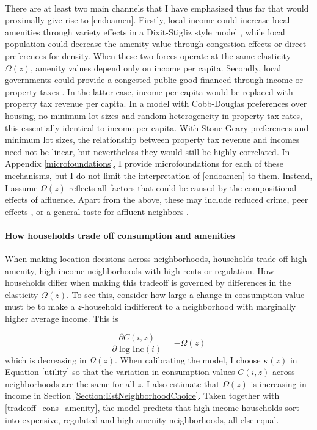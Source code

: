 \documentclass[12pt]{article}
\begin{document}
	 \paragraph*{}
	There are at least two main channels that I have emphasized thus far that would proximally give rise to \eqref{endoamen}. Firstly, local income could increase local amenities through variety effects in a Dixit-Stigliz style model \citep{AlmagroDI, Coutureetal}, while local population could decrease the amenity value through congestion effects or direct preferences for density. When these two forces operate at the same elasticity $\Omega(z)$, amenity values depend only on income per capita. Secondly, local governments could provide a congested public good financed through income or property taxes \citep{calabresetal, ineffTiebout}. In the latter case, income per capita would be replaced with property tax revenue per capita. In a model with Cobb-Douglas preferences over housing, no minimum lot sizes and random heterogeneity in property tax rates, this essentially identical to income per capita. With Stone-Geary preferences and minimum lot sizes, the relationship between property tax revenue and incomes need not be linear, but nevertheless they would still be highly correlated. In Appendix \ref{microfoundations}, I provide microfoundations for each of these mechanisms, but I do not limit the interpretation of \eqref{endoamen} to them. Instead, I assume $\Omega(z)$ reflects all factors that could be caused by the compositional effects of affluence. Apart from the above, these may include reduced crime, peer effects \citep{chettyhendren}, or a general taste for affluent neighbors \citep{ghh2013, parispoor}. 

	
	\paragraph*{How households trade off consumption and amenities} When making location decisions across neighborhoods, households trade off high amenity, high income neighborhoods with high rents or regulation. How households differ when making this tradeoff is governed by differences in the elasticity $\Omega(z)$. To see this, consider how large a change in consumption value must be to make a $z$-household indifferent to a neighborhood with marginally higher average income. This is 
	
	\begin{equation}\label{tradeoff_cons_amenity}
		\frac{\partial C(i, z)}{\partial \log \text{Inc}(i)} = -\Omega(z)
	\end{equation} 
	which is decreasing in $\Omega(z)$. When calibrating the model, I choose $\kappa(z)$ in Equation \eqref{utility} so that the variation in consumption values $C(i, z)$ across neighborhoods are the same for all $z$. I also estimate that $\Omega(z)$ is increasing in income in Section \ref{Section:EstNeighborhoodChoice}. Taken together with \eqref{tradeoff_cons_amenity}, the model predicts that high income households sort into expensive, regulated and high amenity neighborhoods, all else equal. 
	
\end{document}
